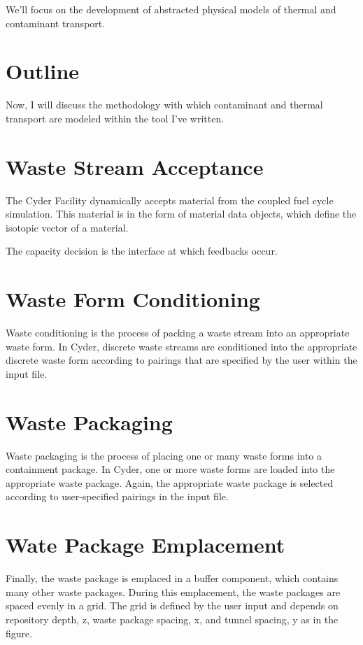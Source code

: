 \documentclass[letterpaper]{article}
\begin{document}
We'll focus on the development of abstracted physical models of thermal and 
contaminant transport.

\section{Outline}

Now, I will discuss the methodology with which contaminant and thermal 
transport are modeled within the tool I've written.

\section{Waste Stream Acceptance}

The Cyder Facility dynamically accepts material from the coupled fuel
cycle simulation. This material is in the form of material data objects, which 
define the isotopic vector of a material.

The capacity decision is the interface at which feedbacks 
occur.

\section{Waste Form Conditioning}

Waste conditioning is the process of packing a waste stream into an appropriate 
waste form.  In Cyder, discrete waste streams are conditioned into the 
appropriate discrete waste form according to pairings that are specified by the 
user within the input file.

\section{Waste Packaging}

Waste packaging is the process of placing one or many waste forms into a 
containment package.  In Cyder, one or more waste forms are loaded into the 
appropriate waste package. Again, the appropriate waste package is selected 
according to user-specified pairings in the input file. 


\section{Wate Package Emplacement}

Finally, the waste package is emplaced in a buffer component, which contains 
many other waste packages. During this emplacement, the waste packages are 
spaced evenly in a grid. The grid is defined by the user input and depends on 
repository depth, z, waste package spacing, x, and tunnel spacing, y as in 
the figure.
\end{document}
